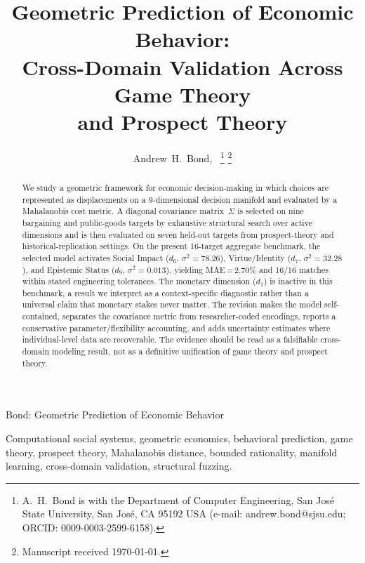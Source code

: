 \documentclass[journal]{IEEEtran}
\begin{document}
\onecolumn
\begingroup
\small

\endgroup
\twocolumn

\title{Geometric Prediction of Economic Behavior:\\Cross-Domain Validation Across Game Theory\\and Prospect Theory}

\author{Andrew~H.~Bond,~%
\thanks{A.~H.~Bond is with the Department of Computer Engineering, San Jos\'{e} State University, San Jos\'{e}, CA 95192 USA (e-mail: andrew.bond@sjsu.edu; ORCID: 0009-0003-2599-6158).}%
\thanks{Manuscript received \today.}}

%
{Bond: Geometric Prediction of Economic Behavior}

\maketitle

\begin{abstract}
We study a geometric framework for economic decision-making in which choices are represented as displacements on a 9-dimensional decision manifold and evaluated by a Mahalanobis cost metric.
A diagonal covariance matrix~$\Sigma$ is selected on nine bargaining and public-goods targets by exhaustive structural search over active dimensions and is then evaluated on seven held-out targets from prospect-theory and historical-replication settings.
On the present 16-target aggregate benchmark, the selected model activates Social Impact ($d_6$, $\sigma^2=78.26$), Virtue/Identity ($d_7$, $\sigma^2=32.28$), and Epistemic Status ($d_9$, $\sigma^2=0.013$), yielding MAE\,=\,2.70\% and 16/16 matches within stated engineering tolerances.
The monetary dimension ($d_1$) is inactive in this benchmark, a result we interpret as a context-specific diagnostic rather than a universal claim that monetary stakes never matter.
The revision makes the model self-contained, separates the covariance metric from researcher-coded encodings, reports a conservative parameter/flexibility accounting, and adds uncertainty estimates where individual-level data are recoverable.
The evidence should be read as a falsifiable cross-domain modeling result, not as a definitive unification of game theory and prospect theory.
\end{abstract}

\begin{IEEEkeywords}
Computational social systems, geometric economics, behavioral prediction, game theory, prospect theory, Mahalanobis distance, bounded rationality, manifold learning, cross-domain validation, structural fuzzing.
\end{IEEEkeywords}
\end{document}
